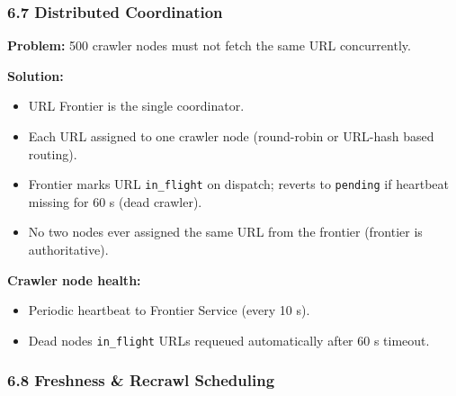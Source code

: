 \documentclass[11pt]{article}
\providecommand{\tightlist}{\setlength{\itemsep}{1pt}\setlength{\parskip}{0pt}}
\begin{document}
\subsubsection{6.7 Distributed Coordination}\label{67-distributed-coordination}

\textbf{Problem:} 500 crawler nodes must not fetch the same URL concurrently.

\textbf{Solution:}

\begin{itemize}
\tightlist
\item
  URL Frontier is the single coordinator.
\item
  Each URL assigned to one crawler node (round-robin or URL-hash based routing).
\item
  Frontier marks URL \texttt{in\_flight} on dispatch; reverts to \texttt{pending} if heartbeat missing for 60 s (dead crawler).
\item
  No two nodes ever assigned the same URL from the frontier (frontier is authoritative).
\end{itemize}

\textbf{Crawler node health:}

\begin{itemize}
\tightlist
\item
  Periodic heartbeat to Frontier Service (every 10 s).
\item
  Dead node\textquotesingle s \texttt{in\_flight} URLs requeued automatically after 60 s timeout.
\end{itemize}

\subsubsection{6.8 Freshness \& Recrawl Scheduling}\label{68-freshness--recrawl-scheduling}
\end{document}
